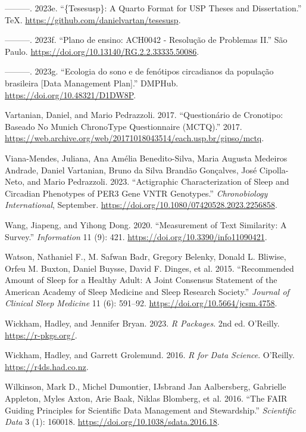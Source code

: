 \documentclass[
  12pt,
  a4paper,
  oneside]{tesesusp}
\newlength{\cslhangindent}
\newlength{\cslentryspacingunit} %
\newenvironment{CSLReferences}[2] %
 {%
  \setlength{\parindent}{0pt}
  \ifodd #1
  \let\oldpar\par
  \def\par{\hangindent=\cslhangindent\oldpar}
  \fi
  \setlength{\parskip}{#2\cslentryspacingunit}
 }%
 {}
\begin{document}
\begin{CSLReferences}{1}{0}
\leavevmode{}%
---------. 2023e. {``\{Tesesusp\}: A Quarto Format for USP Theses and
Dissertation.''} TeX. \url{https://github.com/danielvartan/tesesusp}.

\leavevmode{}%
---------. 2023f. {``Plano de ensino: ACH0042 - Resolução de Problemas
II.''} São Paulo. \url{https://doi.org/10.13140/RG.2.2.33335.50086}.

\leavevmode{}%
---------. 2023g. {``Ecologia do sono e de fenótipos circadianos da
população brasileira {[}Data Management Plan{]}.''} DMPHub.
\url{https://doi.org/10.48321/D1DW8P}.

\leavevmode{}%
Vartanian, Daniel, and Mario Pedrazzoli. 2017. {``Questionário de
Cronotipo: Baseado No Munich ChronoType Questionnaire (MCTQ).''} 2017.
\url{https://web.archive.org/web/20171018043514/each.usp.br/gipso/mctq}.

\leavevmode{}%
Viana-Mendes, Juliana, Ana Amélia Benedito-Silva, Maria Augusta Medeiros
Andrade, Daniel Vartanian, Bruno da Silva Brandão Gonçalves, José
Cipolla-Neto, and Mario Pedrazzoli. 2023. {``Actigraphic
Characterization of Sleep and Circadian Phenotypes of PER3 Gene VNTR
Genotypes.''} \emph{Chronobiology International}, September.
\url{https://doi.org/10.1080/07420528.2023.2256858}.

\leavevmode{}%
Wang, Jiapeng, and Yihong Dong. 2020. {``Measurement of Text Similarity:
A Survey.''} \emph{Information} 11 (9): 421.
\url{https://doi.org/10.3390/info11090421}.

\leavevmode{}%
Watson, Nathaniel F., M. Safwan Badr, Gregory Belenky, Donald L.
Bliwise, Orfeu M. Buxton, Daniel Buysse, David F. Dinges, et al. 2015.
{``Recommended Amount of Sleep for a Healthy Adult: A Joint Consensus
Statement of the American Academy of Sleep Medicine and Sleep Research
Society.''} \emph{Journal of Clinical Sleep Medicine} 11 (6): 591--92.
\url{https://doi.org/10.5664/jcsm.4758}.

\leavevmode{}%
Wickham, Hadley, and Jennifer Bryan. 2023. \emph{R Packages}. 2nd ed.
O'Reilly. \url{https://r-pkgs.org/}.

\leavevmode{}%
Wickham, Hadley, and Garrett Grolemund. 2016. \emph{R for Data Science}.
O'Reilly. \url{https://r4ds.had.co.nz}.

\leavevmode{}%
Wilkinson, Mark D., Michel Dumontier, IJsbrand Jan Aalbersberg,
Gabrielle Appleton, Myles Axton, Arie Baak, Niklas Blomberg, et al.
2016. {``The FAIR Guiding Principles for Scientific Data Management and
Stewardship.''} \emph{Scientific Data} 3 (1): 160018.
\url{https://doi.org/10.1038/sdata.2016.18}.

\end{CSLReferences}
\end{document}
